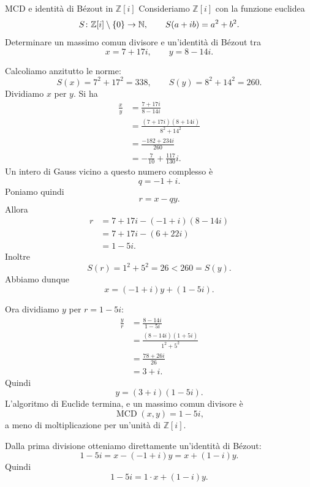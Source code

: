 \documentclass[a4paper]{article}
\begin{document}
\begin{radioactive}
\begin{snippetexercise}{MCD e identità di Bézout in \(\mathbb{Z}[i]\)}
    Consideriamo \(\mathbb{Z}[i]\) con la funzione euclidea
    \[
        S\colon \mathbb{Z}[i]\setminus\{0\}\to \mathbb{N},
        \qquad
        S(a+ib)=a^2+b^2.
    \]
    Determinare un massimo comun divisore e un'identità di Bézout tra
    \[
        x=7+17i,
        \qquad
        y=8-14i.
    \]
\end{snippetexercise}
\end{radioactive}

\begin{radioactive}
\begin{snippetsolution}{}
    Calcoliamo anzitutto le norme:
    \[
        S(x)=7^2+17^2=338,
        \qquad
        S(y)=8^2+14^2=260.
    \]
    Dividiamo \(x\) per \(y\). Si ha
    \begin{align*}
        \frac{x}{y}
        &=
        \frac{7+17i}{8-14i} \\
        &=
        \frac{(7+17i)(8+14i)}{8^2+14^2} \\
        &=
        \frac{-182+234i}{260} \\
        &=
        -\frac{7}{10}+\frac{117}{130}i.
    \end{align*}
    Un intero di Gauss vicino a questo numero complesso è
    \[
        q=-1+i.
    \]
    Poniamo quindi
    \[
        r=x-qy.
    \]
    Allora
    \begin{align*}
        r
        &=
        7+17i-(-1+i)(8-14i) \\
        &=
        7+17i-(6+22i) \\
        &=
        1-5i.
    \end{align*}
    Inoltre
    \[
        S(r)=1^2+5^2=26<260=S(y).
    \]
    Abbiamo dunque
    \[
        x=(-1+i)y+(1-5i).
    \]

    Ora dividiamo \(y\) per \(r=1-5i\):
    \begin{align*}
        \frac{y}{r}
        &=
        \frac{8-14i}{1-5i} \\
        &=
        \frac{(8-14i)(1+5i)}{1^2+5^2} \\
        &=
        \frac{78+26i}{26} \\
        &=
        3+i.
    \end{align*}
    Quindi
    \[
        y=(3+i)(1-5i).
    \]
    L'algoritmo di Euclide termina, e un massimo comun divisore è
    \[
        \operatorname{MCD}(x,y)=1-5i,
    \]
    a meno di moltiplicazione per un'unità di \(\mathbb{Z}[i]\).

    Dalla prima divisione otteniamo direttamente un'identità di Bézout:
    \[
        1-5i=x-(-1+i)y=x+(1-i)y.
    \]
    Quindi
    \[
        1-5i
        =
        1\cdot x+(1-i)y.
    \]
\end{snippetsolution}
\end{radioactive}
\end{document}
